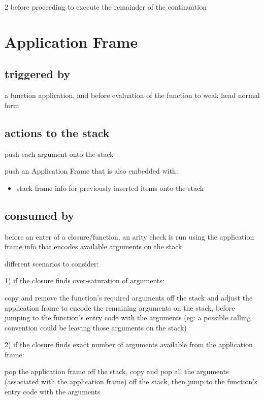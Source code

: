 \documentclass[8pt]{extarticle}
\begin{document}
\begin{multicols*}{2}
  before proceeding to execute the remainder of the continuation
  
  \section{Application Frame}

  \subsection{triggered by}

  a function application, and before evaluation of the function to weak head normal form

  \subsection{actions to the stack}

  push each argument onto the stack

  push an Application Frame that is also embedded with:
  \begin{itemize}
  \item stack frame info for previously inserted items onto the stack
  \end{itemize}

  \subsection{consumed by}

  before an enter of a closure/function, an arity check is run using the application frame info that encodes available arguments on the stack

  different scenarios to consider:

  1) if the closure finds over-saturation of arguments:
  
  copy and remove the function's required arguments off the stack and adjust the application frame to encode the remaining arguments on the stack, before jumping to the function's entry code with the arguments (eg: a possible calling convention could be leaving those arguments on the stack)
    
  2) if the closure finds exact number of arguments available from the application frame:

  pop the application frame off the stack, copy and pop all the arguments (associated with the application frame) off the stack, then jump to the function's entry code with the arguments


\end{multicols*}
\end{document}
